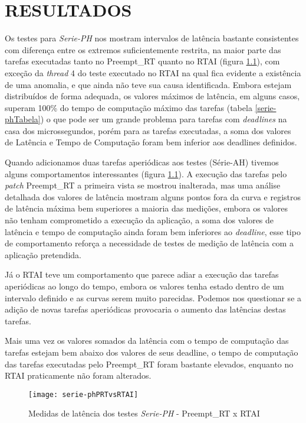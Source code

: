 \chapter{RESULTADOS}
\label{cap:resultados}
Os testes para \textit{Serie-PH} nos mostram intervalos de latência bastante consistentes com diferença entre os extremos suficientemente restrita, na maior parte das tarefas executadas tanto no Preempt\_RT quanto no RTAI (figura \ref{serie-phPRTvsRTAI}), com exceção da \textit{thread} 4 do teste executado no RTAI na qual fica evidente a existência de uma anomalia, e que ainda não teve sua causa identificada. Embora estejam distribuídos de forma  adequada, os valores máximos de latência, em alguns casos, superam 100\% do tempo de computação máximo das tarefas (tabela \ref{serie-phTabela}) o que pode ser um grande problema para tarefas com \textit{deadlines} na casa dos microssegundos, porém para as tarefas executadas, a soma dos valores de Latência e Tempo de Computação foram bem inferior aos deadlines definidos.

Quando adicionamos duas tarefas aperiódicas aos testes (Série-AH) tivemos alguns comportamentos interessantes (figura \ref{serie-phPRTvsRTAI}). A execução das tarefas pelo \textit{patch} Preempt\_RT a primeira vista se mostrou inalterada, mas uma análise detalhada dos valores de latência mostram alguns pontos fora da curva e registros de latência máxima bem superiores a maioria das medições, embora os valores não tenham comprometido a execução da aplicação, a soma dos valores de latência e tempo de computação ainda foram bem inferiores ao \textit{deadline}, esse tipo de comportamento reforça a necessidade de testes de medição de latência com a aplicação pretendida.

Já o RTAI teve um comportamento que parece adiar a execução das tarefas aperiódicas ao longo do tempo,  embora os valores tenha estado dentro de um intervalo definido e as curvas serem muito parecidas. Podemos nos questionar se a adição de novas tarefas aperiódicas provocaria o aumento das latências destas tarefas.

Mais uma vez os valores somados da latência com o tempo de computação das tarefas estejam bem abaixo dos valores de seus deadline, o tempo de computação das tarefas executadas pelo Preempt\_RT foram bastante elevados, enquanto no RTAI praticamente não foram alterados.

\begin{figure}[!htb]
    \centering
    \texttt{[image: serie-phPRTvsRTAI]}
    \caption{Medidas de latência dos testes \textit{Serie-PH} - Preempt\_RT x RTAI}
    \label{serie-phPRTvsRTAI}
\end{figure}

